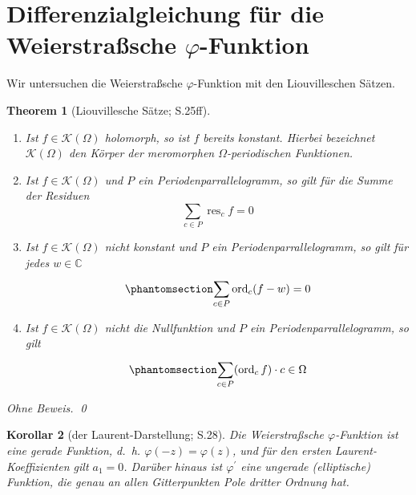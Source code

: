 \documentclass[12pt]{article}
\providecommand{\tightlist}{%
  \setlength{\itemsep}{0pt}\setlength{\parskip}{0pt}}
\newtheorem{theorem}{Theorem}[section]
\newtheorem{kor}[theorem]{Korollar}
\numberwithin{equation}{section}
\newcommand{\kk}{\cite{kk} }
\newcommand{\ohnebew}{Ohne Beweis. \qed}
\begin{document}
\section{\texorpdfstring{Differenzialgleichung für die Weierstraßsche
\(\varphi\)-Funktion}{Differenzialgleichung für die Weierstraßsche \textbackslash varphi-Funktion}}\label{differenzialgleichung-fuxfcr-die-weierstrauxdfsche-varphi-funktion}

Wir untersuchen die Weierstraßsche \(\varphi\)-Funktion mit den
Liouvilleschen Sätzen.

\begin{theorem}[Liouvillesche Sätze; \kk S.25ff]

\begin{enumerate}
\def\labelenumi{\arabic{enumi}.}
\tightlist
\item
  Ist \(f \in \mathcal K(\Omega)\) holomorph, so ist \(f\) bereits
  konstant. Hierbei bezeichnet \(\mathcal K(\Omega)\) den Körper der
  meromorphen \(\Omega\)-periodischen Funktionen.
\item
  Ist \(f \in \mathcal K(\Omega)\) und \(P\) ein
  Periodenparrallelogramm, so gilt für die Summe der Residuen
  \begin{equation}{
  \sum_{c \in P} \operatorname{res}_c f = 0
  }\end{equation}
\item
  Ist \(f \in \mathcal K(\Omega)\) nicht konstant und \(P\) ein
  Periodenparrallelogramm, so gilt für jedes \(w \in \mathbb C\)
  \begin{equation}\protect\phantomsection\label{eq:liouville-3}{
  \sum_{c \in P}^{} \operatorname{ord}_c(f-w) = 0
  }\end{equation}
\item
  Ist \(f \in \mathcal K(\Omega)\) nicht die Nullfunktion und \(P\) ein
  Periodenparrallelogramm, so gilt
  \begin{equation}\protect\phantomsection\label{eq:liouville-4}{
  \sum_{c \in P}^{} ( \operatorname{ord}_c f ) \cdot c \in \Omega
  }\end{equation}
\end{enumerate}

\ohnebew

\end{theorem}

\begin{kor}[der Laurent-Darstellung; \kk S.28]

Die Weierstraßsche \(\varphi\)-Funktion ist eine gerade Funktion, d.~h.
\(\varphi (-z)=\varphi (z)\), und für den ersten Laurent-Koeffizienten
gilt \(a_1=0\). Darüber hinaus ist \(\varphi ^\prime\) eine ungerade
(elliptische) Funktion, die genau an allen Gitterpunkten Pole dritter
Ordnung hat.

\end{kor}
\end{document}
